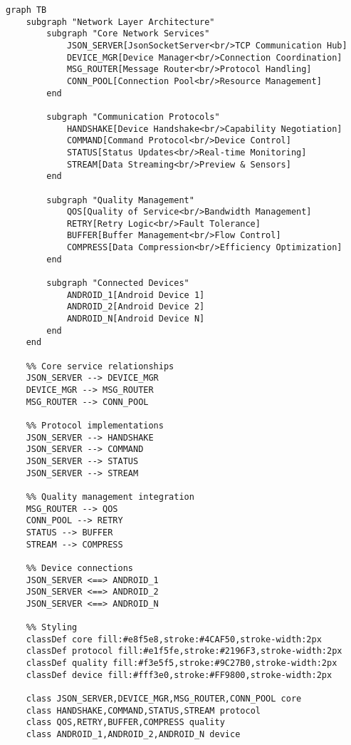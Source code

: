 \documentclass[12pt,a4paper]{article}
\begin{document}
\begin{verbatim}
graph TB
    subgraph "Network Layer Architecture"
        subgraph "Core Network Services"
            JSON_SERVER[JsonSocketServer<br/>TCP Communication Hub]
            DEVICE_MGR[Device Manager<br/>Connection Coordination]
            MSG_ROUTER[Message Router<br/>Protocol Handling]
            CONN_POOL[Connection Pool<br/>Resource Management]
        end
        
        subgraph "Communication Protocols"
            HANDSHAKE[Device Handshake<br/>Capability Negotiation]
            COMMAND[Command Protocol<br/>Device Control]
            STATUS[Status Updates<br/>Real-time Monitoring]
            STREAM[Data Streaming<br/>Preview & Sensors]
        end
        
        subgraph "Quality Management"
            QOS[Quality of Service<br/>Bandwidth Management]
            RETRY[Retry Logic<br/>Fault Tolerance]
            BUFFER[Buffer Management<br/>Flow Control]
            COMPRESS[Data Compression<br/>Efficiency Optimization]
        end
        
        subgraph "Connected Devices"
            ANDROID_1[Android Device 1]
            ANDROID_2[Android Device 2]
            ANDROID_N[Android Device N]
        end
    end
    
    %% Core service relationships
    JSON_SERVER --> DEVICE_MGR
    DEVICE_MGR --> MSG_ROUTER
    MSG_ROUTER --> CONN_POOL
    
    %% Protocol implementations
    JSON_SERVER --> HANDSHAKE
    JSON_SERVER --> COMMAND
    JSON_SERVER --> STATUS
    JSON_SERVER --> STREAM
    
    %% Quality management integration
    MSG_ROUTER --> QOS
    CONN_POOL --> RETRY
    STATUS --> BUFFER
    STREAM --> COMPRESS
    
    %% Device connections
    JSON_SERVER <==> ANDROID_1
    JSON_SERVER <==> ANDROID_2
    JSON_SERVER <==> ANDROID_N
    
    %% Styling
    classDef core fill:#e8f5e8,stroke:#4CAF50,stroke-width:2px
    classDef protocol fill:#e1f5fe,stroke:#2196F3,stroke-width:2px
    classDef quality fill:#f3e5f5,stroke:#9C27B0,stroke-width:2px
    classDef device fill:#fff3e0,stroke:#FF9800,stroke-width:2px
    
    class JSON_SERVER,DEVICE_MGR,MSG_ROUTER,CONN_POOL core
    class HANDSHAKE,COMMAND,STATUS,STREAM protocol
    class QOS,RETRY,BUFFER,COMPRESS quality
    class ANDROID_1,ANDROID_2,ANDROID_N device
\end{verbatim}
\end{document}

